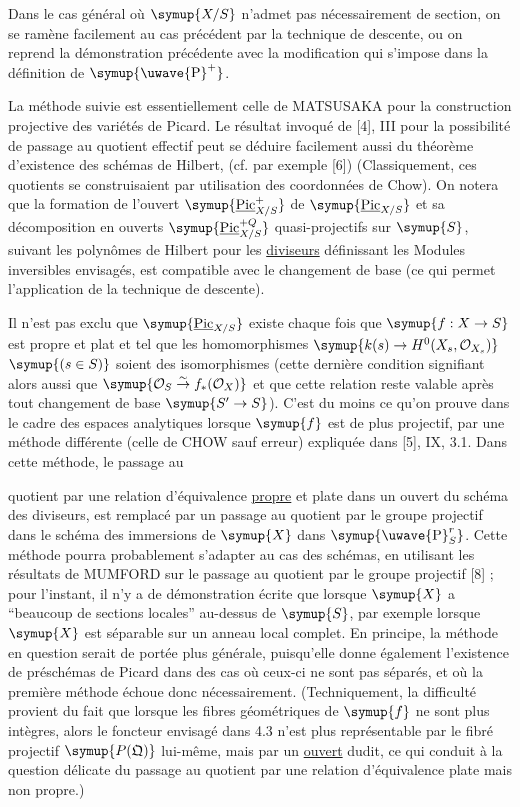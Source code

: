 Dans le cas général où $\symup{X/S}$ n'admet pas nécessairement de section, on se
ramène facilement au cas précédent par la technique de descente, ou on reprend
la démonstration précédente avec la modification qui s'impose dans la
définition de $\symup{\text{\uwave{P}}^+}$.

 La méthode suivie est essentiellement celle de MATSUSAKA
pour la construction projective des variétés de Picard. Le résultat invoqué de
[4], III pour la possibilité de passage au quotient effectif peut se déduire
facilement aussi du théorème d'existence des schémas de Hilbert, (cf. par
exemple [6]) (Classiquement, ces quotients se construisaient par utilisation
des coordonnées de Chow). On notera que la formation de l'ouvert
$\symup{\underline{\operatorname{Pic}}^{+}_{X/S}}$ de $\symup{\underline{\operatorname{Pic}}_{X/S}}$ et sa
décomposition en ouverts $\symup{\underline{\operatorname{Pic}}^{+Q}_{X/S}}$ quasi-projectifs sur
$\symup{S}$, suivant les polynômes de Hilbert pour les \uline{diviseurs} définissant les
Modules inversibles envisagés, est compatible avec le changement de base (ce
qui permet l'application de la technique de descente).

 Il n'est pas exclu que $\symup{\underline{\operatorname{Pic}}_{X/S}}$ existe
chaque fois que $\symup{f:X\to S}$ est propre et plat et tel que les
homomorphismes $\symup{k(s)\to H^0(X_s,\mathcal O_{X_s})}$
$\symup{(s\in S)}$ soient des isomorphismes (cette dernière condition signifiant alors aussi que
$\symup{\mathcal O_S\overset{\sim}{\to}f_*(\mathcal O_X)}$ et que cette relation reste
valable après tout changement de base $\symup{S'\to S}$). C'est du moins
ce qu'on prouve dans le cadre des espaces analytiques lorsque $\symup{f}$ est de plus
projectif, par une méthode différente (celle de
CHOW sauf erreur) expliquée
dans [5], IX, 3.1. Dans cette
méthode, le passage au

quotient par une relation d'équivalence \uline{propre} et plate dans un ouvert du
schéma des diviseurs, est remplacé par un passage au quotient par le groupe
projectif dans le schéma des immersions de $\symup{X}$ dans $\symup{\text{\uwave{P}}^r_S}$. Cette
méthode pourra probablement s'adapter au cas des schémas, en utilisant les
résultats de MUMFORD sur le passage au quotient par le groupe projectif [8] ;
pour l'instant, il n'y a de démonstration écrite que lorsque $\symup{X}$ a ``beaucoup
de sections locales'' au-dessus de $\symup{S}$, par exemple lorsque $\symup{X}$ est séparable
sur un anneau local complet. En principe, la méthode en question serait de
portée plus générale, puisqu'elle donne également l'existence de préschémas de
Picard dans des cas où ceux-ci ne sont pas séparés, et où la première méthode
échoue donc nécessairement. (Techniquement, la difficulté provient du fait que
lorsque les fibres géométriques de $\symup{f}$ ne sont plus intègres, alors le foncteur
envisagé dans 4.3 n'est plus représentable par le fibré projectif
$\symup{P(\mathfrak Q)}$ lui-même, mais par un \uline{ouvert} dudit, ce qui conduit à la
question délicate du passage au quotient par une relation d'équivalence plate
mais non propre.)

